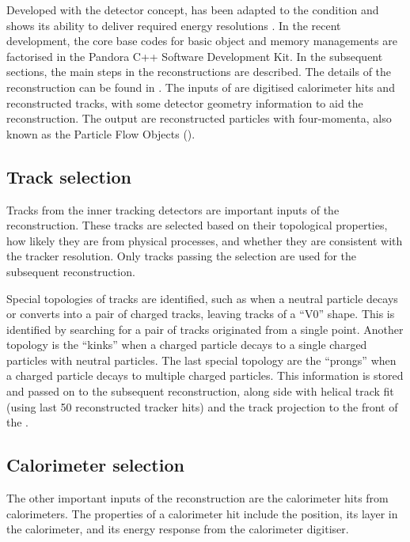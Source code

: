 Developed with the \ILD detector concept, \pandora has been adapted to the \CLIC condition and shows its ability to deliver required energy resolutions \cite{Linssen:2012hp}.  In the recent development, the core base codes for basic object and memory managements are factorised in the Pandora C++ Software Development Kit\cite{Marshall:2015rfa}.
In the subsequent sections, the main steps in the \pandora reconstructions are described. The details of the reconstruction can be found in \cite{Thomson:2009rp,Marshall:2012ry,Marshall:2015rfa}. The inputs of \pandora are digitised calorimeter hits and reconstructed tracks, with some detector geometry information to aid the reconstruction. The output are reconstructed particles with four-momenta, also known as the Particle Flow Objects (\PFOs).

\subsection{Track selection}
\label{sec:pandoraPandoraTrack}

Tracks from the inner tracking detectors are important inputs of the \pandora reconstruction. These tracks are selected based on their topological properties, how likely they are from physical processes, and whether they are consistent with the tracker resolution. Only tracks passing the selection are used for the subsequent reconstruction.

Special topologies of tracks are identified, such as when a neutral particle decays or converts into a pair of charged tracks, leaving tracks of a ``V0''  shape. This is identified by searching for a pair of tracks originated from a single point. Another topology is the ``kinks'' when a charged particle decays to a single charged particles with neutral particles. The last special topology are  the ``prongs'' when a charged particle decays to multiple charged particles. This information is stored and passed on to the subsequent reconstruction, along side with helical track fit (using last 50 reconstructed tracker hits) and the track projection to the front of the \ECAL.

\subsection{Calorimeter selection}

The other important inputs of  the \pandora reconstruction are the calorimeter hits from calorimeters. The properties of a calorimeter hit include the position, its layer in the calorimeter, and its energy response from the calorimeter digitiser.

